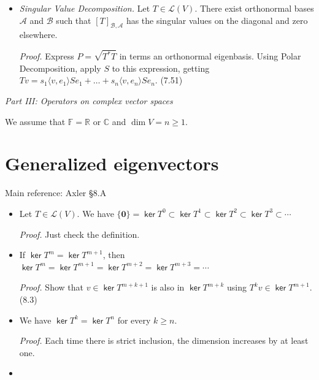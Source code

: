 \documentclass[11pt]{article}
\newcommand{\1}{\mathbf{1}}
\newcommand{\0}{\mathbf{0}}
\newcommand{\C}{\mathbb{C}}
\newcommand{\F}{\mathbb{F}}
\newcommand{\R}{\mathbb{R}}
\DeclareMathOperator{\myker}{\mathsf{ker}}
\renewcommand{\geq}{\geqslant}
\begin{document}
{\begin{itemize}
\item

\emph{Singular Value Decomposition.}
Let $T\in\mathcal{L}(V)$.
There exist orthonormal bases $\mathcal{A}$ and $\mathcal{B}$ such that $[T]_{\mathcal{B},\mathcal{A}}$ has the singular values on the diagonal and zero elsewhere.

\emph{Proof.}
Express $P=\sqrt{T^*T}$ in terms an orthonormal eigenbasis.
Using Polar Decomposition, apply $S$ to this expression, getting
$Tv=s_1\langle v,e_1\rangle Se_1+\dots+s_n\langle v,e_n\rangle S e_n.$
\hfill
(7.51)

\end{itemize}


\clearpage

\hfil
\emph{\Large Part III: Operators on complex vector spaces}

\bigskip

\hfill
We assume that $\F = \R \text{ or }\C$ and $\dim V = n \geq 1$.

\section{Generalized eigenvectors}

Main reference:
Axler \S8.A

\begin{itemize}

\item

Let $T\in\mathcal{L}(V)$. We have $\{\0\}=\myker T^0\subset \myker T^1\subset \myker T^2\subset \myker T^3 \subset \cdots$

\emph{Proof.}
Just check the definition.

\item

If $\myker T^m = \myker T^{m+1}$, then $\myker T^m = \myker T^{m+1} = \myker T^{m+2} = \myker T^{m+3} = \cdots$

\emph{Proof.}
Show that $v \in \myker T^{m+k+1}$ is also in $\myker T^{m+k}$ using $T^k v \in \myker T^{m+1}$.
\hfill
(8.3)

\item

We have $\myker T^k= \myker T^n$ for every $k \geq n$.

\emph{Proof.}
Each time there is strict inclusion, the dimension increases by at least one.

\item


\end{itemize}}
\end{document}
